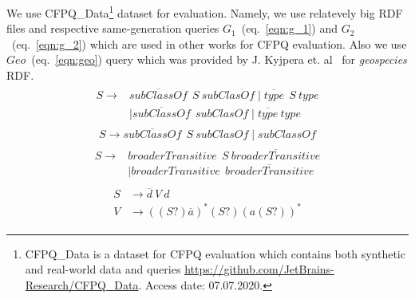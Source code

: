 We use CFPQ\_Data\footnote{CFPQ\_Data is a dataset for CFPQ evaluation which contains both synthetic and real-world data and queries \url{https://github.com/JetBrains-Research/CFPQ\_Data}. Access date: 07.07.2020.} dataset for evaluation.
Namely, we use relatevely big RDF files and respective same-generation queries $G_1$~(eq.~\ref{eqn:g_1}) and $G_2$~(eq.~\ref{eqn:g_2}) which are used in other works for CFPQ evaluation. 
Also we use $Geo$~(eq.~\ref{eqn:geo}) query which was provided by J. Kyjpera et. al~\cite{!!!} for \textit{geospecies} RDF.
\begin{align}
\begin{split}
\label{eqn:g_1}
S \to & \overline{\textit{subClassOf}} \ \ S \ \textit{subClasOf} \mid \overline{\textit{type}} \ \ S \ \textit{type}\\   & \mid \overline{\textit{subClassOf}} \ \ \textit{subClasOf} \mid \overline{\textit{type}} \ \textit{type}
\end{split}
\end{align}
\begin{align}
\label{eqn:g_2}
S \to \overline{\textit{subClassOf}} \ \ S \ \textit{subClasOf} \mid \textit{subClassOf}
\end{align}
\begin{align}
\begin{split}
\label{eqn:geo}
S \to & \textit{broaderTransitive} \ \  S \ \overline{\textit{broaderTransitive}} \\
      & \mid \textit{broaderTransitive} \ \  \overline{\textit{broaderTransitive}}
\end{split}
\end{align}
\begin{align}
\begin{split}
\label{eqn:ma}
S & \to \overline{d} \ V \ d \\
V & \to ((S?) \overline{a})^* (S?) (a (S?))^*
\end{split}
\end{align}

